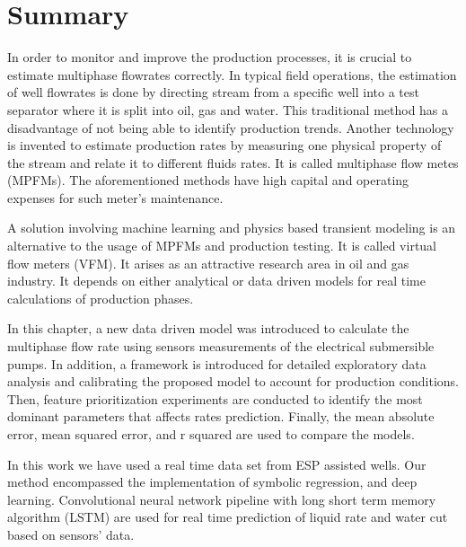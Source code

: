 \section{Summary}
In order to monitor and improve the production processes, it is crucial to estimate multiphase flowrates correctly. In typical field operations, the estimation of well flowrates is done by directing stream from a specific well into a test separator where it is split into oil, gas and water. This traditional method has a disadvantage of not being able to identify production trends. Another technology is invented to estimate production rates by measuring one physical property of the stream and relate it to different fluids rates. It is called multiphase flow metes (MPFMs). The aforementioned methods have high capital and operating expenses for such meter’s maintenance. 

A solution involving machine learning and physics based transient modeling is an alternative to the usage of MPFMs and production testing. It is called virtual flow meters (VFM). It arises as an attractive research area in oil and gas industry. It depends on either analytical or data driven models for real time calculations of production phases.

In this chapter, a new data driven model was introduced to calculate the multiphase flow rate using sensors measurements of the electrical submersible pumps. In addition, a framework is introduced for detailed exploratory data analysis and calibrating the proposed model to account for production conditions. Then, feature prioritization experiments are conducted to identify the most dominant parameters that affects rates prediction. Finally, the mean absolute error, mean squared error, and r squared are used to compare the models. 

In this work we have used a real time data set from ESP assisted wells. Our method encompassed the implementation of symbolic regression, and deep learning. Convolutional neural network pipeline with long short term memory algorithm (LSTM) are used for real time prediction of liquid rate and water cut based on sensors’ data.  


